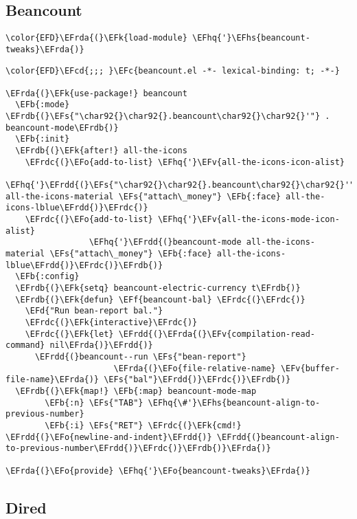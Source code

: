 \documentclass[a4wide,10pt]{article}
\newcommand{\EFc}[1]{\textcolor{EFc}{#1}} %
\newcommand{\EFcd}[1]{\textcolor{EFcd}{#1}} %
\newcommand{\EFs}[1]{\textcolor{EFs}{#1}} %
\newcommand{\EFd}[1]{\textcolor{EFd}{#1}} %
\newcommand{\EFk}[1]{\textcolor{EFk}{#1}} %
\newcommand{\EFb}[1]{\textcolor{EFb}{#1}} %
\newcommand{\EFf}[1]{\textcolor{EFf}{#1}} %
\newcommand{\EFv}[1]{\textcolor{EFv}{#1}} %
\newcommand{\EFo}[1]{\textcolor{EFo}{#1}} %
\newcommand{\EFhq}[1]{\textcolor{EFhq}{#1}} %
\newcommand{\EFhs}[1]{\textcolor{EFhs}{#1}} %
\newcommand{\EFrda}[1]{\textcolor{EFrda}{#1}} %
\newcommand{\EFrdb}[1]{\textcolor{EFrdb}{#1}} %
\newcommand{\EFrdc}[1]{\textcolor{EFrdc}{#1}} %
\newcommand{\EFrdd}[1]{\textcolor{EFrdd}{#1}} %
\begin{document}
\subsection{Beancount}
\label{sec:orgc6f3002}
\begin{Code}
\begin{Verbatim}
\color{EFD}\EFrda{(}\EFk{load-module} \EFhq{'}\EFhs{beancount-tweaks}\EFrda{)}
\end{Verbatim}
\end{Code}
\begin{Code}
\begin{Verbatim}
\color{EFD}\EFcd{;;; }\EFc{beancount.el -*- lexical-binding: t; -*-}

\EFrda{(}\EFk{use-package!} beancount
  \EFb{:mode} \EFrdb{(}\EFs{"\char92{}\char92{}.beancount\char92{}\char92{}'"} . beancount-mode\EFrdb{)}
  \EFb{:init}
  \EFrdb{(}\EFk{after!} all-the-icons
    \EFrdc{(}\EFo{add-to-list} \EFhq{'}\EFv{all-the-icons-icon-alist}
                 \EFhq{'}\EFrdd{(}\EFs{"\char92{}\char92{}.beancount\char92{}\char92{}'"} all-the-icons-material \EFs{"attach\_money"} \EFb{:face} all-the-icons-lblue\EFrdd{)}\EFrdc{)}
    \EFrdc{(}\EFo{add-to-list} \EFhq{'}\EFv{all-the-icons-mode-icon-alist}
                 \EFhq{'}\EFrdd{(}beancount-mode all-the-icons-material \EFs{"attach\_money"} \EFb{:face} all-the-icons-lblue\EFrdd{)}\EFrdc{)}\EFrdb{)}
  \EFb{:config}
  \EFrdb{(}\EFk{setq} beancount-electric-currency t\EFrdb{)}
  \EFrdb{(}\EFk{defun} \EFf{beancount-bal} \EFrdc{(}\EFrdc{)}
    \EFd{"Run bean-report bal."}
    \EFrdc{(}\EFk{interactive}\EFrdc{)}
    \EFrdc{(}\EFk{let} \EFrdd{(}\EFrda{(}\EFv{compilation-read-command} nil\EFrda{)}\EFrdd{)}
      \EFrdd{(}beancount--run \EFs{"bean-report"}
                      \EFrda{(}\EFo{file-relative-name} \EFv{buffer-file-name}\EFrda{)} \EFs{"bal"}\EFrdd{)}\EFrdc{)}\EFrdb{)}
  \EFrdb{(}\EFk{map!} \EFb{:map} beancount-mode-map
        \EFb{:n} \EFs{"TAB"} \EFhq{\#'}\EFhs{beancount-align-to-previous-number}
        \EFb{:i} \EFs{"RET"} \EFrdc{(}\EFk{cmd!} \EFrdd{(}\EFo{newline-and-indent}\EFrdd{)} \EFrdd{(}beancount-align-to-previous-number\EFrdd{)}\EFrdc{)}\EFrdb{)}\EFrda{)}

\EFrda{(}\EFo{provide} \EFhq{'}\EFo{beancount-tweaks}\EFrda{)}

\end{Verbatim}
\end{Code}
\subsection{Dired}
\label{sec:org205c180}
\end{document}
